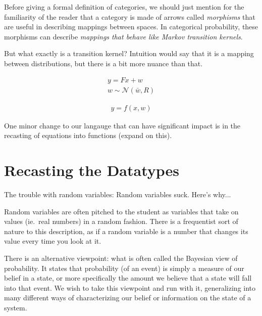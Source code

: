 Before giving a formal definition of categories, we should just mention for the familiarity of the reader that a category is made of arrows called \emph{morphisms} that are useful in describing mappings between spaces. In categorical probability, these morphisms can describe \emph{mappings that behave like Markov transition kernels}.

But what exactly is a transition kernel?
Intuition would say that it is a mapping between distributions, but there is a bit more nuance than that.

\newcommand{\normal}{\mathcal{N}}
\newcommand{\reals}{\mathds{R}}
\begin{equation}
\label{traditional-gaussian-model}
\begin{gathered}
    y = Fx + w \\
    w \sim \normal(\bar{w}, R)
\end{gathered}
\end{equation}

\begin{equation}
    \begin{aligned}
	y = f(x,w)
    \end{aligned}
\end{equation}

One minor change to our langauge that can have significant impact is in the recasting of equations into functions (expand on this).

\section{Recasting the Datatypes}
The trouble with random variables:
Random variables suck. Here's why...

Random variables are often pitched to the student as variables that take on values (ie.\ real numbers) in a random fashion.
There is a frequentist sort of nature to this description, as if a random variable is a number that changes its value every time you look at it.

There is an alternative viewpoint: what is often called the Bayesian view of probability.
It states that probability (of an event) is simply a measure of our belief in a state, or more specifically the amount we believe that a state will fall into that event.
We wish to take this viewpoint and run with it, generalizing into many different ways of characterizing our belief or information on the state of a system.

